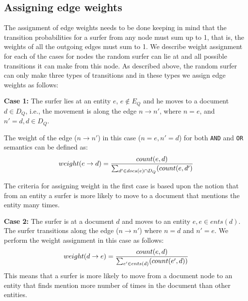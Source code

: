 \subsection*{Assigning edge weights}
The assignment of edge weights needs to be done keeping in mind that the
transition probabilities for a surfer from any node must sum up to 1, that is,
the weights of all the outgoing edges must sum to 1.
We describe weight assignment for each of the cases for nodes the random surfer can lie
at and all possible transitions it can make from this node.
As described above, the random surfer can only make three types of transitions and
in these types we assign edge weights as follows:

\vspace{2mm}\noindent
{\bf Case 1:} The surfer lies at an entity $e$, $e \notin E_Q$ and he moves to
a document $d \in D_Q$, i.e., the movement is along the edge $n \rightarrow n'$, where
$n=e$, and $n'=d, d \in D_Q$.

The weight of the edge ($n \rightarrow n'$) in this case ($n=e, n'=d$) for
both {\tt AND} and {\tt OR} semantics can be defined as:
\begin{equation}
\begin{split}
\small
weight(e \rightarrow d) = \frac{count(e,d)}{\sum_{d' \in docs(e) \cap D_Q}(count(e,d')}
\end{split}
\end{equation}

\vspace{2mm}\noindent
The criteria for assigning weight in the first case is based upon the
notion that from an entity a surfer is more likely to move to a document
that mentions the entity many times. %


\vspace{2mm}\noindent
{\bf Case 2:} The surfer is at a document $d$ and moves to an entity $e, e \in ents(d)$.
The surfer transitions along the edge ($n \rightarrow n'$) where $n=d$ and $n'=e$.
We perform the weight assignment in this case as follows:
\begin{equation}
\begin{split}
\small
weight(d \rightarrow e) = \frac{count(e, d)}{\sum_{e' \in ents(d)}(count(e',d))}
\end{split}
\end{equation}
This means that a surfer is more likely to move from a document node to an entity
that finds mention more number of times in the document than other entities.

